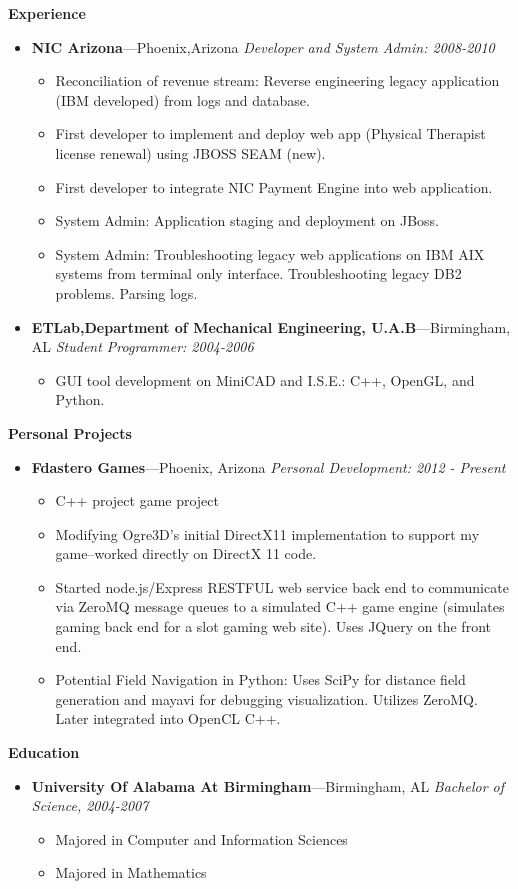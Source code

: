 \documentclass[10pt,oneside]{report}
\newenvironment{ressection}[1]{
	\vspace{1pt}
  {\normalsize\textbf{#1}}
  
  \begin{itemize}
  \vspace{1pt}
}{
 	\end{itemize}
}
\newcommand{\ressubitem}[1]{
	\vspace{-1pt}
	\item \begin{flushleft} #1 \end{flushleft}
}
\newcommand{\resbigitem}[3]{
	\vspace{1pt}
  \small
  \item
  \textbf{#1}---#2 
  \textit{#3}
}
\newenvironment{ressubsec}[3]{
	\resbigitem{#1}{#2}{#3}
  \vspace{-2pt}
	\begin{itemize}
}{
	\end{itemize}
}
\begin{document}
\begin{ressection}{Experience}
  \begin{ressubsec}{NIC Arizona}{Phoenix,Arizona}{Developer and System Admin: 2008-2010}
    \ressubitem{Reconciliation of revenue stream: Reverse engineering legacy application (IBM developed) from logs and database.}
    \ressubitem{First developer to implement and deploy web app (Physical Therapist license renewal) using JBOSS SEAM (new).}
    \ressubitem{First developer to integrate NIC Payment Engine into web application.}
    \ressubitem{System Admin: Application staging and deployment on JBoss.}
    \ressubitem{System Admin: Troubleshooting legacy web applications on IBM AIX systems from terminal only interface. Troubleshooting legacy DB2 problems. Parsing logs.} 
    \end{ressubsec}
  \begin{ressubsec}{ETLab,Department of Mechanical Engineering, U.A.B}
    {Birmingham, AL}{Student Programmer: 2004-2006}
    \ressubitem{GUI tool development on MiniCAD and I.S.E.: C++, OpenGL, and Python.}
  \end{ressubsec}
\end{ressection}
\begin{ressection}{Personal Projects}
  \begin{ressubsec}{Fdastero Games}{Phoenix, Arizona}{Personal Development: 2012 - Present}
    \ressubitem{C++ project game project}
    \ressubitem{Modifying Ogre3D's initial DirectX11 implementation to support my game--worked directly on DirectX 11 code.}
    \ressubitem{Started node.js/Express RESTFUL web service back end to communicate via ZeroMQ message queues to a simulated C++ game engine (simulates gaming back end for a slot gaming web site). Uses JQuery on the front end.}
    \ressubitem{Potential Field Navigation in Python: Uses SciPy for distance field generation and mayavi for debugging visualization. Utilizes ZeroMQ. Later integrated into OpenCL C++.}
  \end{ressubsec}
\end{ressection}


\begin{ressection}{Education}
	\begin{ressubsec}{University Of Alabama At Birmingham}{Birmingham, AL}{Bachelor of Science, 2004-2007}
		\ressubitem{Majored in Computer and Information Sciences}
		\ressubitem{Majored in Mathematics}
	\end{ressubsec}
\end{ressection}
\end{document}
